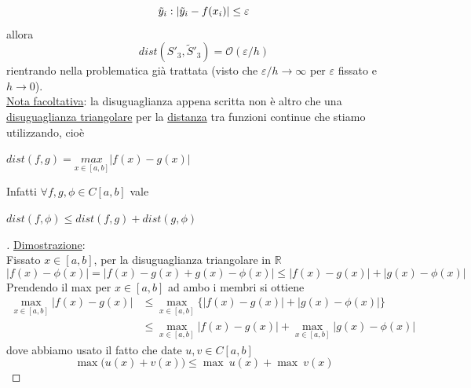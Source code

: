 \documentclass[12pt,a4paper]{article}
\DeclarePairedDelimiter{\abs}{\lvert}{\rvert}
\begin{document}
\[
\tilde{y}_i : \abs{\tilde{y}_i - f(x_i)} \le \varepsilon
\]
allora
\[
dist(S'_3, \tilde{S}'_3) = \mathcal{O}(\varepsilon/h)
\]
rientrando nella problematica già trattata (visto che $\varepsilon/h \to \infty$ per $\varepsilon$ fissato e $h \to 0$).\\
\uline{Nota facoltativa}: la disuguaglianza appena scritta non è altro che una \uline{disuguaglianza triangolare} per la \uline{distanza} tra funzioni continue che stiamo utilizzando, cioè \\
\begin{center}
$dist(f,g) = \underset{x \in [a,b]}{max} |f(x)-g(x)|$\\
\end{center}
Infatti $\forall f,g,\phi \in C[a,b]$ vale \\
\begin{center}
$dist(f,\phi)\leq dist(f,g) + dist(g,\phi)$\\
\end{center}

\begin{proof}[\unskip\nopunct]
\uline{Dimostrazione}:\\
Fissato $x\in [a,b]$, per la disuguaglianza triangolare in $\mathbb{R}$
\[
| f(x) - \phi(x) | = | f(x) - g(x) + g(x) - \phi(x) | \leq | f(x) - g(x) | + | g(x) - \phi(x) |
\]
Prendendo il max per $x \in [a,b]$ ad ambo i membri si ottiene
\[ \begin{split}
\underset{x \in [a,b]}{\max} |f(x)-g(x)| & \leq \underset{x \in [a,b]}{\max} \{ |f(x)-g(x)| + |g(x)-\phi(x)| \} \\
& \leq \underset{x \in [a,b]}{\max} |f(x)-g(x)|+ \underset{x \in [a,b]}{\max} |g(x)-\phi(x)|
\end{split} \]
dove abbiamo usato il fatto che date $u,v \in C[a,b]$
\[
\max\Big( u(x)+v(x) \Big) \leq \max \ u(x) + \max \ v(x)
\]
\end{proof}
\end{document}
